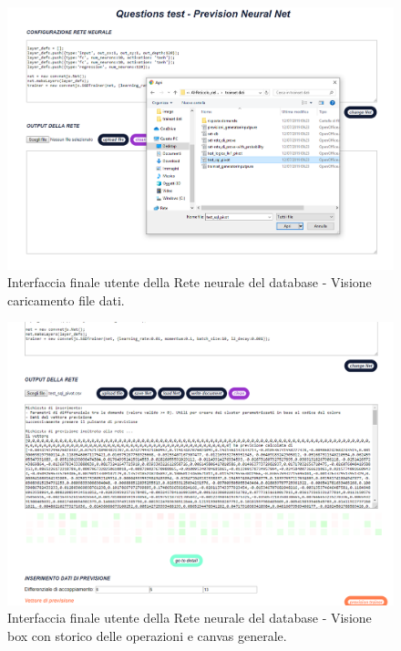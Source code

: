 \begin{figure}[H]
\centering
	\includegraphics[width=1\linewidth]{./image/Rete-di-prova_db.png}
	\caption{Interfaccia finale utente della Rete neurale del database - Visione caricamento file dati.}
	\label{Interfaccia finale utente della Rete neurale del database -1.}
\end{figure}
\noindent

\begin{figure}[H]
\centering
	\includegraphics[width=1\linewidth]{./image/Rete-di-prova_db2.png}
	\caption{Interfaccia finale utente della Rete neurale del database - Visione box con storico delle operazioni e canvas generale.}
	\label{Interfaccia finale utente della Rete neurale del database -2.}
\end{figure}
\noindent

